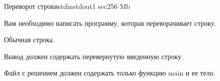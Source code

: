 \begin{problem}{Переворот строки}{stdin}{stdout}{1 sec}{256 Mb}

Вам необходимо написать программу, которая переворачивает строку.

\InputFile

Обычная строка.

\OutputFile

Вывод должен содержать перевернутую введенную строку.
\Example

\begin{example}
%
\end{example}

\Note

Файл с решением должен содержать только функцию main и ее тело.

\end{problem}